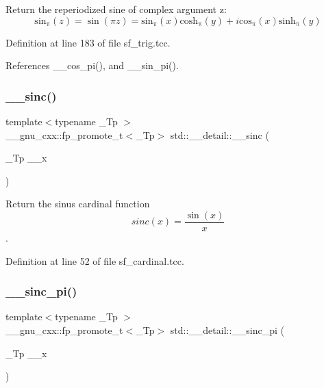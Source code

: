 Return the reperiodized sine of complex argument z\+: \[ \mathrm{sin_\pi}(z) = \sin(\pi z) = \mathrm{sin_\pi}(x) \mathrm{cosh_\pi}(y) + i \mathrm{cos_\pi}(x) \mathrm{sinh_\pi}(y) \] 

Definition at line 183 of file sf\+\_\+trig.\+tcc.



References \+\_\+\+\_\+cos\+\_\+pi(), and \+\_\+\+\_\+sin\+\_\+pi().

\mbox{\label{namespacestd_1_1____detail_ad0730b2b26df36cc8876a1152d895523}} 
\subsubsection{\texorpdfstring{\+\_\+\+\_\+sinc()}{\_\_sinc()}}
{\footnotesize\ttfamily template$<$typename \+\_\+\+Tp $>$ \\
\+\_\+\+\_\+gnu\+\_\+cxx\+::fp\+\_\+promote\+\_\+t$<$\+\_\+\+Tp$>$ std\+::\+\_\+\+\_\+detail\+::\+\_\+\+\_\+sinc (\begin{DoxyParamCaption}\item[{\+\_\+\+Tp}]{\+\_\+\+\_\+x }\end{DoxyParamCaption})}



Return the sinus cardinal function \[ sinc(x) = \frac{\sin(x)}{x} \]. 



Definition at line 52 of file sf\+\_\+cardinal.\+tcc.

\mbox{\label{namespacestd_1_1____detail_ae73746d4ab5c5087c5d302e428490396}} 
\subsubsection{\texorpdfstring{\+\_\+\+\_\+sinc\+\_\+pi()}{\_\_sinc\_pi()}}
{\footnotesize\ttfamily template$<$typename \+\_\+\+Tp $>$ \\
\+\_\+\+\_\+gnu\+\_\+cxx\+::fp\+\_\+promote\+\_\+t$<$\+\_\+\+Tp$>$ std\+::\+\_\+\+\_\+detail\+::\+\_\+\+\_\+sinc\+\_\+pi (\begin{DoxyParamCaption}\item[{\+\_\+\+Tp}]{\+\_\+\+\_\+x }\end{DoxyParamCaption})}



